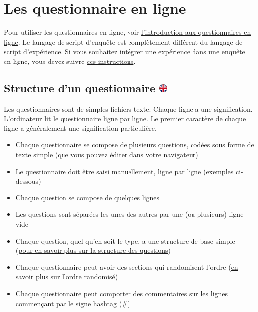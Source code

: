 \documentclass[
]{book}
\providecommand{\tightlist}{%
  \setlength{\itemsep}{0pt}\setlength{\parskip}{0pt}}
\begin{document}
\hypertarget{s8}{%
\chapter{Les questionnaire en ligne}\label{s8}}

Pour utiliser les questionnaires en ligne, voir \protect\hyperlink{s7}{l'introduction aux questionnaires en ligne}.
Le langage de script d'enquête est complètement différent du langage de script d'expérience. Si vous souhaitez intégrer une expérience dans une enquête en ligne, vous devez suivre \href{https://www.psytoolkit.org/doc3.2.0/online-survey-syntax.html\#experiment}{ces instructions}.

\hypertarget{structure-dun-questionnaire}{%
\section[Structure d'un questionnaire ]{\texorpdfstring{Structure d'un questionnaire \href{https://www.psytoolkit.org/doc3.1.0/online-survey-syntax.html\#_structure_of_questionnaire}{\protect\includegraphics{img/ukflag.png}}}{Structure d'un questionnaire }}\label{structure-dun-questionnaire}}

Les questionnaires sont de simples fichiers texte. Chaque ligne a une signification. L'ordinateur lit le questionnaire ligne par ligne. Le premier caractère de chaque ligne a généralement une signification particulière.

\begin{itemize}
\tightlist
\item
  Chaque questionnaire se compose de plusieurs questions, codées sous forme de texte simple (que vous pouvez éditer dans votre navigateur)
\item
  Le questionnaire doit être saisi manuellement, ligne par ligne (exemples ci-dessous)
\item
  Chaque question se compose de quelques lignes
\item
  Les questions sont séparées les unes des autres par une (ou plusieurs) ligne vide
\item
  Chaque question, quel qu'en soit le type, a une structure de base simple (\protect\hyperlink{s8-1-1}{pour en savoir plus sur la structure des questions})
\item
  Chaque questionnaire peut avoir des sections qui randomisent l'ordre (\protect\hyperlink{}{en savoir plus sur l'ordre randomisé})
\item
  Chaque questionnaire peut comporter des \protect\hyperlink{}{commentaires} sur les lignes commençant par le signe hashtag (\#)
\end{itemize}
\end{document}
